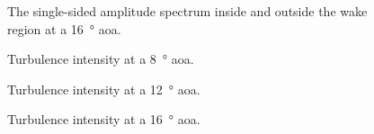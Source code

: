 \begin{figure}[htpb]
     \centering
     
     \caption[A graph of the single-sided amplitude spectrum inside and outside the wake at a sixteen degree angle of attack.]{The single-sided amplitude spectrum inside and outside the wake region at a \qty{16}{\degree} \acrshort{aoa}.}
     \label{fig:SSAS_at_16AoA}
\end{figure}


\begin{figure}[htpb]
     \centering
     
     \caption[A graph of turbulence intensity vs position.]{Turbulence intensity at a \qty{8}{\degree} \acrshort{aoa}.}
     \label{fig:Ydelta_vs_TI_8AoA}
\end{figure}

\begin{figure}[htpb]
     \centering
     
     \caption[A graph of turbulence intensity vs position.]{Turbulence intensity at a \qty{12}{\degree} \acrshort{aoa}.}
     \label{fig:Ydelta_vs_TI_12AoA}
\end{figure}

\begin{figure}[htpb]
     \centering
     
     \caption[A graph of turbulence intensity vs position.]{Turbulence intensity at a \qty{16}{\degree} \acrshort{aoa}.}
     \label{fig:Ydelta_vs_TI_16AoA}
\end{figure}


